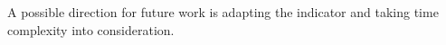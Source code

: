 \documentclass{article}
\begin{document}
  A possible direction for future work is adapting the indicator and taking time complexity into consideration.
  
  
  
  
  
  
  \vfill\pagebreak
  
  
  
  
  
  
\end{document}
